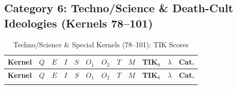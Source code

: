 \documentclass[11pt,a4paper]{article}
\theoremstyle{definition}
\theoremstyle{remark}
\begin{document}
\subsection{Category 6: Techno/Science \& Death-Cult Ideologies
  (Kernels 78--101)}
\label{sec:cat6}

\begin{longtable}{@{}l|cccccccc|cc|c@{}}
\caption{Techno/Science \& Special Kernels (78--101): TIK Scores}
\label{tab:techno}\\
\toprule
\textbf{Kernel} &
$Q$ & $E$ & $I$ & $S$ & $O_1$ & $O_2$ & $T$ & $M$ &
\textbf{TIK$_8$} & $\lambda$ & \textbf{Cat.} \\
\midrule
\endfirsthead
\toprule
\textbf{Kernel} &
$Q$ & $E$ & $I$ & $S$ & $O_1$ & $O_2$ & $T$ & $M$ &
\textbf{TIK$_8$} & $\lambda$ & \textbf{Cat.} \\
\midrule
\endhead
\bottomrule
\endlastfoot


\end{longtable}
\end{document}
